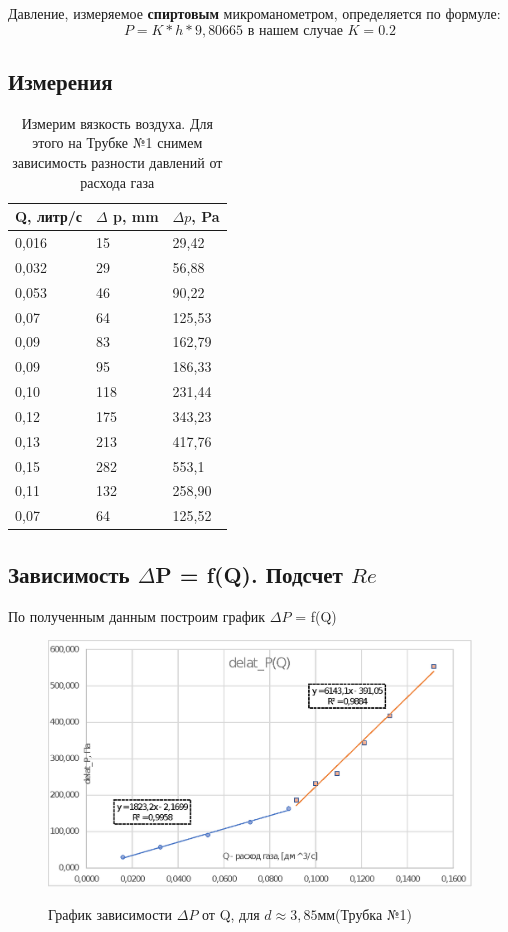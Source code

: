 \documentclass[a4paper,12pt]{article}
\theoremstyle{plain} %
\theoremstyle{definition} %
\theoremstyle{remark} %
\begin{document}
Давление, измеряемое \textbf{спиртовым} микроманометром, определяется по формуле:
$$P=K*h*9,80665 \text{ в нашем случае } K = 0.2$$

\subsection{Измерения}

\begin{table}[H]
\centering
\caption{Измерим вязкость воздуха. Для этого на Трубке №1 снимем зависимость  разности давлений от расхода газа}
\label{tab:tab1}
\begin{tabular}{|l|l|l|}
\hline
Q, литр/с & $\Delta$ p, mm & $\Delta p$, Pa \\ \hline
0,016 & 15 & 29,42 \\ [0.4ex]
0,032 & 29 & 56,88 \\[0.4ex]
0,053 & 46 & 90,22 \\[0.4ex]
0,07 & 64 & 125,53 \\[0.4ex]
0,09 & 83 & 162,79 \\[0.4ex]
0,09 & 95 & 186,33\\[0.4ex]
0,10 & 118 & 231,44 \\[0.4ex]
0,12 & 175 & 343,23 \\[0.4ex]
0,13 & 213 & 417,76 \\[0.4ex]
0,15 & 282 & 553,1 \\[0.4ex]
0,11 & 132 & 258,90 \\[0.4ex]
0,07 & 64 & 125,52 \\ \hline
\end{tabular}
\end{table}

\newpage
\subsection{Зависимость $\Delta$P = f(Q). Подсчет $Re$}
По полученным данным построим график $\Delta P$ = f(Q)


\begin{figure}[!h]
{\includegraphics[width=1\linewidth]{graph1.eps}}
\caption{График зависимости $\Delta P$ от Q, для $d \approx 3,85 мм$(Трубка №1)}
\end{figure}
\end{document}
